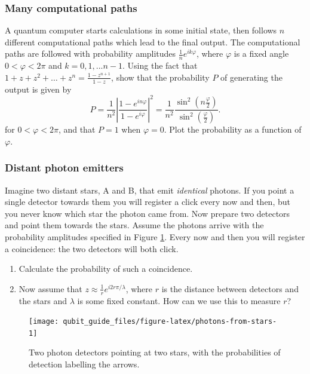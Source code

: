 \documentclass[fleqn,a4paper]{article}
\providecommand{\tightlist}{\setlength{\itemsep}{0pt}\setlength{\parskip}{0pt}}
\theoremstyle{definition}
\theoremstyle{definition}
\theoremstyle{definition}
\theoremstyle{definition}
\theoremstyle{remark}
\begin{document}
\hypertarget{many-computational-paths}{%
\subsubsection{Many computational paths}\label{many-computational-paths}}

A quantum computer starts calculations in some initial state, then follows \(n\) different computational paths which lead to the final output.
The computational paths are followed with probability amplitudes \(\frac{1}{n}e^{i k \varphi}\), where \(\varphi\) is a fixed angle \(0< \varphi <2\pi\) and \(k=0,1,...n-1\).
Using the fact that \(1+z+z^2+\ldots + z^n= \frac{1-z^{n+1}}{1-z}\), show that the probability \(P\) of generating the output is given by
\[
  P
  = \frac{1}{n^2}\left\vert
    \frac{1-e^{i n\varphi}}{1-e^{i\varphi}}
  \right\vert^2
  = \frac{1}{n^2} \frac{\sin^2 (n\frac{\varphi}{2})}{\sin^2 (\frac{\varphi}{2})}.
\]
for \(0<\varphi<2\pi\), and that \(P=1\) when \(\varphi=0\).
Plot the probability as a function of \(\varphi\).

\hypertarget{distant-photon-emitters}{%
\subsubsection{Distant photon emitters}\label{distant-photon-emitters}}

Imagine two distant stars, A and B, that emit \emph{identical} photons.
If you point a single detector towards them you will register a click every now and then, but you never know which star the photon came from.
Now prepare two detectors and point them towards the stars.
Assume the photons arrive with the probability amplitudes specified in Figure \ref{fig:photons-from-stars}.
Every now and then you will register a coincidence: the two detectors will both click.

\begin{enumerate}
\def\labelenumi{\alph{enumi}.}
\tightlist
\item
  Calculate the probability of such a coincidence.
\item
  Now assume that \(z\approx \frac{1}{r}e^{i{2r\pi}/{\lambda}}\), where \(r\) is the distance between detectors and the stars and \(\lambda\) is some fixed constant. How can we use this to measure \(r\)?
\end{enumerate}

\begin{figure}[H]

{\centering \texttt{[image: qubit\_guide\_files/figure-latex/photons-from-stars-1]} 

}

\caption{Two photon detectors pointing at two stars, with the probabilities of detection labelling the arrows.}\label{fig:photons-from-stars}
\end{figure}
\end{document}
